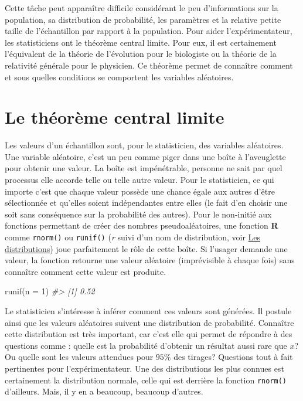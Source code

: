 \documentclass[
]{book}
\newenvironment{Shaded}{}{}
\newcommand{\AttributeTok}[1]{#1}
\newcommand{\CommentTok}[1]{\textit{#1}}
\newcommand{\DecValTok}[1]{#1}
\newcommand{\FunctionTok}[1]{#1}
\newcommand{\NormalTok}[1]{#1}
\begin{document}
Cette tâche peut apparaître difficile considérant le peu d'informations sur la population, sa distribution de probabilité, les paramètres et la relative petite taille de l'échantillon par rapport à la population. Pour aider l'expérimentateur, les statisticiens ont le théorème central limite. Pour eux, il est certainement l'équivalent de la théorie de l'évolution pour le biologiste ou la théorie de la relativité générale pour le physicien. Ce théorème permet de connaître comment et sous quelles conditions se comportent les variables aléatoires.

\hypertarget{le-thuxe9oruxe8me-central-limite}{%
\section{Le théorème central limite}\label{le-thuxe9oruxe8me-central-limite}}

Les valeurs d'un échantillon sont, pour le statisticien, des variables aléatoires. Une variable aléatoire, c'est un peu comme piger dans une boîte à l'aveuglette pour obtenir une valeur. La boîte est impénétrable, personne ne sait par quel processus elle accorde telle ou telle autre valeur. Pour le statisticien, ce qui importe c'est que chaque valeur possède une chance égale aux autres d'être sélectionnée et qu'elles soient indépendantes entre elles (le fait d'en choisir une soit sans conséquence sur la probabilité des autres). Pour le non-initié aux fonctions permettant de créer des nombres pseudoaléatoires, une fonction \textbf{R} comme \texttt{rnorm()} ou \texttt{runif()} (\emph{r} suivi d'un nom de distribution, voir \protect\hyperlink{les-distributions}{Les distributions}) joue parfaitement le rôle de cette boîte. Si l'usager demande une valeur, la fonction retourne une valeur aléatoire (imprévisible à chaque fois) sans connaître comment cette valeur est produite.

\begin{Shaded}
\begin{Highlighting}[]
\FunctionTok{runif}\NormalTok{(}\AttributeTok{n =} \DecValTok{1}\NormalTok{)}
\CommentTok{\#\textgreater{} [1] 0.52}
\end{Highlighting}
\end{Shaded}

Le statisticien s'intéresse à inférer comment ces valeurs sont générées. Il postule ainsi que les valeurs aléatoires suivent une distribution de probabilité. Connaître cette distribution est très important, car c'est elle qui permet de répondre à des questions comme : quelle est la probabilité d'obtenir un résultat aussi rare que \(x\)? Ou quelle sont les valeurs attendues pour \(95\%\) des tirages? Questions tout à fait pertinentes pour l'expérimentateur. Une des distributions les plus connues est certainement la distribution normale, celle qui est derrière la fonction \texttt{rnorm()} d'ailleurs. Mais, il y en a beaucoup, beaucoup d'autres.
\end{document}
